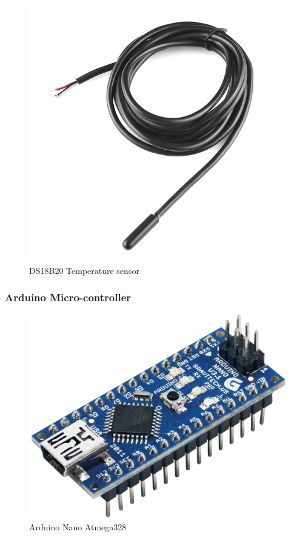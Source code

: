 \documentclass[10pt]{beamer}
\begin{document}
{{\begin{frame}
\begin{figure}[h!]
			\includegraphics[scale=1]{sensor}
			\caption{DS18B20 Temperature sensor}
		\end{figure}
	\end{frame}
}
{
	\begin{frame}
		\frametitle{Arduino Micro-controller}
		\begin{figure}[h!]
				\includegraphics[scale=0.1]{arduino_nano}
				\caption{Arduino Nano Atmega328}
		\end{figure}
	\end{frame}
}

}
\end{document}
